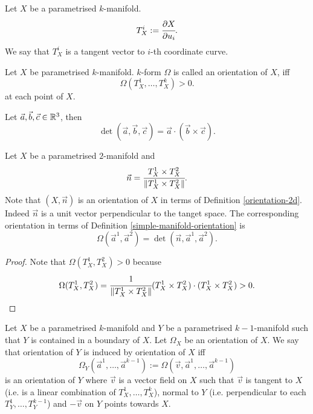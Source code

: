 \documentclass[main.tex]{subfiles}
\begin{document}
\begin{definition}
Let $X$ be a parametrised $k$-manifold.
\begin{equation}
T^i_X := \cfrac{\partial X}{\partial u_i}.
\end{equation}
We say that $T^i_X$ is a tangent vector to $i$-th coordinate curve. 
\end{definition}
\begin{definition}
\label{simple-manifold-orientation}
Let $X$ be parametrised $k$-manifold. $k$-form $\Omega$ is called an orientation of $X$, iff
\begin{equation}
\Omega(T_X^1, \dots, T_X^k) > 0.
\end{equation}
at each point of $X$.
\end{definition}
\begin{proposition}
Let $\vec{a}, \vec{b}, \vec{c}\in \mathbb{R}^3$, then
\begin{equation}
\det(\vec{a}, \vec{b}, \vec{c}) = \vec{a}\cdot (\vec{b}\times \vec{c}).
\end{equation} 
\end{proposition}
\begin{example}
\label{surface-orientation}
Let $X$ be a parametrised $2$-manifold and
\begin{equation} 
\vec{n} = \cfrac{T^1_X\times T^2_X}{\norm{T^1_X\times T^2_X}}. 
\end{equation}
Note that $(X,\vec{n})$ is an orientation of $X$ in terms of Definition \ref{orientation-2d}. Indeed $\vec{n}$ is a unit vector perpendicular to the tanget space. The corresponding orientation in terms of Definition \ref{simple-manifold-orientation} is 
\begin{equation}
\Omega(\vec{a}^1, \vec{a}^2) = \det(\vec{n}, \vec{a}^1, \vec{a}^2).
\end{equation}
\end{example}
\begin{proof}
Note that $\Omega(T^1_X, T^2_X) > 0$ because
\begin{equation}
\Omega(T^1_X, T^2_X) = \cfrac{1}{\norm{T^1_X\times T^2_X}}(T^1_X\times T^2_X)\cdot (T^1_X\times T^2_X) > 0.
\end{equation}
\end{proof}
\begin{definition}
\label{simple-induced-orientation}
Let $X$ be a parametrised $k$-manifold and $Y$ be a parametrised $k-1$-manifold such that $Y$ is contained in a boundary of $X$. Let $\Omega_X$ be an orientation of $X$. We say that orientation of $Y$ is induced by orientation of $X$ iff
\begin{equation}
\Omega_Y(\vec{a}^1, \dots, \vec{a}^{k-1}) := \Omega(\vec{v}, \vec{a}^1, \dots, \vec{a}^{k-1}) 
\end{equation}
is an orientation of $Y$ where $\vec{v}$ is a vector field on $X$ such that $\vec{v}$ is tangent to $X$ (i.e. is a linear combination of $T_X^1, \dots, T_X^k$), normal to $Y$ (i.e. perpendicular to each $T_Y^1, \dots, T_Y^{k-1}$) and $-\vec{v}$ on $Y$ points towards $X$.
\end{definition}
\end{document}
